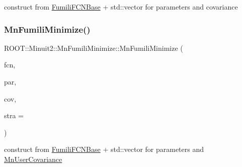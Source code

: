construct from \mbox{\hyperlink{classROOT_1_1Minuit2_1_1FumiliFCNBase}{Fumili\+F\+C\+N\+Base}} + std\+::vector for parameters and covariance 

\mbox{\label{classROOT_1_1Minuit2_1_1MnFumiliMinimize_a48eae3f1c5b8eef3b6940d3fd5d26af8}} 
\subsubsection{\texorpdfstring{MnFumiliMinimize()}{MnFumiliMinimize()}\hspace{0.1cm}{\footnotesize\ttfamily [3/14]}}
{\footnotesize\ttfamily R\+O\+O\+T\+::\+Minuit2\+::\+Mn\+Fumili\+Minimize\+::\+Mn\+Fumili\+Minimize (\begin{DoxyParamCaption}\item[{const \mbox{\hyperlink{classROOT_1_1Minuit2_1_1FumiliFCNBase}{Fumili\+F\+C\+N\+Base}} \&}]{fcn,  }\item[{const std\+::vector$<$ double $>$ \&}]{par,  }\item[{const \mbox{\hyperlink{classROOT_1_1Minuit2_1_1MnUserCovariance}{Mn\+User\+Covariance}} \&}]{cov,  }\item[{unsigned int}]{stra = {} }\end{DoxyParamCaption})\hspace{0.3cm}{\ttfamily [inline]}}



construct from \mbox{\hyperlink{classROOT_1_1Minuit2_1_1FumiliFCNBase}{Fumili\+F\+C\+N\+Base}} + std\+::vector for parameters and \mbox{\hyperlink{classROOT_1_1Minuit2_1_1MnUserCovariance}{Mn\+User\+Covariance}} 

\mbox{\label{classROOT_1_1Minuit2_1_1MnFumiliMinimize_aec4f0adff373393b4023f3a783b7d4bd}} 

